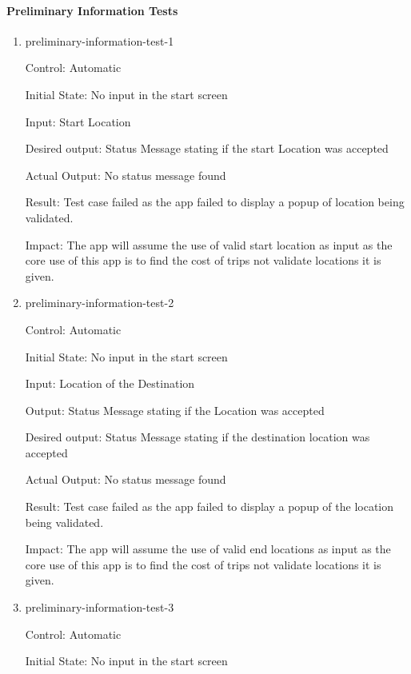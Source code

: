 \documentclass[12pt, titlepage]{article}
\begin{document}
\paragraph{Preliminary Information Tests} 

\begin{enumerate}

\item{preliminary-information-test-1\\}

Control: Automatic
					
Initial State: No input in the start screen
					
Input: Start Location
					
Desired output: Status Message stating if the start Location was accepted

Actual Output: No status message found

Result: Test case failed as the app failed to display a popup of location being validated.

Impact: The app will assume the use of valid start location as input as the core use of this app is 
to find the cost of trips not validate locations it is given.
					
\item{preliminary-information-test-2\\}

Control: Automatic
					
Initial State: No input in the start screen
					
Input: Location of the Destination
					
Output: Status Message stating if the Location was accepted

Desired output: Status Message stating if the destination location was accepted

Actual Output: No status message found

Result: Test case failed as the app failed to display a popup of the location being validated.

Impact: The app will assume the use of valid end locations as input as the core use of this app is 
to find the cost of trips not validate locations it is given.

\item{preliminary-information-test-3\\}

Control: Automatic
					
Initial State: No input in the start screen
					

\end{enumerate}
\end{document}
